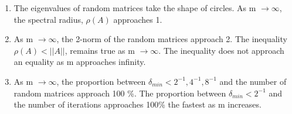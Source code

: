 \documentclass[12pt]{article}
\begin{document}
	\begin{enumerate}[label = (\alph*)]
		\item The eigenvalues of random matrices take the shape of circles. As m $\rightarrow \infty$, the spectral radius, $\rho(A)$ approaches 1.
		\item As  m $\rightarrow \infty$, the 2-norm of the random matrices approach 2. The inequality $\rho(A) < || A ||$, remains true as m $\rightarrow \infty$.  The inequality does not approach an equality as m approaches infinity.
		\item As m $\rightarrow \infty$, the proportion between $\delta_{min} < 2^{-1}, 4^{-1}, 8^{-1}$ and the number of random matrices approach 100 \%.  The proportion between $\delta_{min} < 2^{-1}$ and the number of iterations approaches 100\% the fastest as m increases.
	\end{enumerate}
\end{document}
